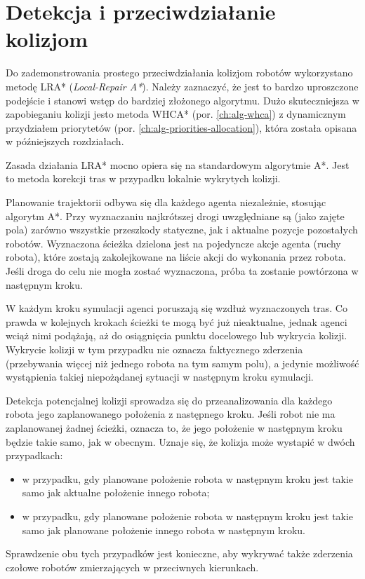 \section{Detekcja i przeciwdziałanie kolizjom}
\label{ch:alg-collision-avoid}

Do zademonstrowania prostego przeciwdziałania kolizjom robotów wykorzystano metodę LRA* ({\it Local-Repair A*}).
Należy zaznaczyć, że jest to bardzo uproszczone podejście i stanowi wstęp do bardziej złożonego algorytmu.
Dużo skuteczniejsza w zapobieganiu kolizji jesto metoda WHCA* (por. \ref{ch:alg-whca}) z dynamicznym przydziałem priorytetów (por. \ref{ch:alg-priorities-allocation}), która została opisana w późniejszych rozdziałach.

Zasada działania LRA* mocno opiera się na standardowym algorytmie A*. Jest to metoda korekcji tras w przypadku lokalnie wykrytych kolizji.

Planowanie trajektorii odbywa się dla każdego agenta niezależnie, stosując algorytm A*. Przy wyznaczaniu najkrótszej drogi uwzględniane są (jako zajęte pola) zarówno wszystkie przeszkody statyczne, jak i aktualne pozycje pozostałych robotów. Wyznaczona ścieżka dzielona jest na pojedyncze akcje agenta (ruchy robota), które zostają zakolejkowane na liście akcji do wykonania przez robota. Jeśli droga do celu nie mogła zostać wyznaczona, próba ta zostanie powtórzona w następnym kroku.

W każdym kroku symulacji agenci poruszają się wzdłuż wyznaczonych tras. Co prawda w kolejnych krokach ścieżki te mogą być już nieaktualne, jednak agenci wciąż nimi podążają, aż do osiągnięcia punktu docelowego lub wykrycia kolizji.
Wykrycie kolizji w tym przypadku nie oznacza faktycznego zderzenia (przebywania więcej niż jednego robota na tym samym polu), a jedynie możliwość wystąpienia takiej niepożądanej sytuacji w następnym kroku symulacji.

Detekcja potencjalnej kolizji sprowadza się do przeanalizowania dla każdego robota jego zaplanowanego położenia z następnego kroku. Jeśli robot nie ma zaplanowanej żadnej ścieżki, oznacza to, że jego położenie w następnym kroku będzie takie samo, jak w obecnym. Uznaje się, że kolizja może wystapić w dwóch przypadkach:
\begin{itemize}
	\item w przypadku, gdy planowane położenie robota w następnym kroku jest takie samo jak aktualne położenie innego robota;
	\item w przypadku, gdy planowane położenie robota w następnym kroku jest takie samo jak planowane położenie innego robota w następnym kroku.
\end{itemize}
Sprawdzenie obu tych przypadków jest konieczne, aby wykrywać także zderzenia czołowe robotów zmierzających w przeciwnych kierunkach.

